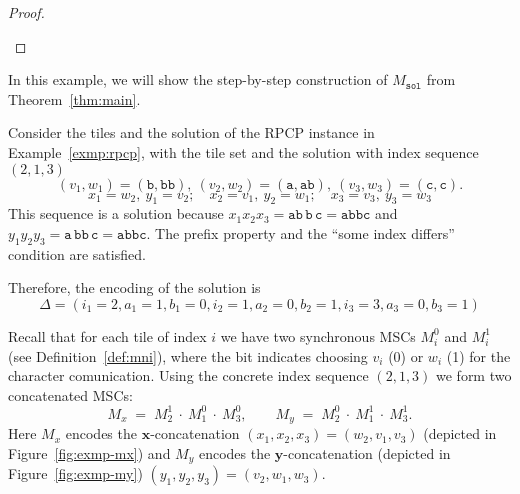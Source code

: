 \begin{proof}
\begin{itemize}
	\end{itemize}

\end{proof}

In this example, we will show the step-by-step construction 
of $M_{\texttt{sol}}$ from Theorem~\ref{thm:main}.

\bigskip

\begin{example}\label{exm:teo}
Consider the tiles and the solution of the RPCP instance 
in Example~\ref{exmp:rpcp}, with the tile set and the solution
with index sequence $(2,1,3)$
$$
 (v_1,w_1)=(\texttt{b},\texttt{bb}),\ 
 (v_2,w_2)=(\texttt{a},\texttt{ab}),\ 
 (v_3,w_3)=(\texttt{c},\texttt{c}).
$$
$$
 x_1=w_2,\ y_1=v_2;\quad x_2=v_1,\ y_2=w_1;\quad x_3=v_3,\ y_3=w_3
$$
This sequence is a solution because
$x_1x_2x_3=\texttt{ab}\,\texttt{b}\,\texttt{c}=\texttt{abbc}$ and
$y_1y_2y_3=\texttt{a}\,\texttt{bb}\,\texttt{c}=\texttt{abbc}$. The
prefix property and the ``some index differs'' condition are satisfied.

Therefore, the encoding of the solution is
$$\Delta = (i_1=2,a_1=1,b_1=0,i_2=1,a_2=0,b_2=1,i_3=3,a_3=0,b_3=1)$$

Recall that for each tile of index \(i\) we have two synchronous MSCs
\(M_i^0\) and \(M_i^1\) (see Definition~\ref{def:mni}), where the bit
indicates choosing \(v_i\) (0) or \(w_i\) (1) for the character comunication.
Using the concrete index sequence \((2,1,3)\) we form two
concatenated MSCs:
\[
  M_x\;=\; M^{1}_{2}\ \cdot\ M^{0}_{1}\ \cdot\ M^{0}_{3},
\qquad
  M_y\;=\; M^{0}_{2}\ \cdot\ M^{1}_{1}\ \cdot\ M^{1}_{3}.
\]
Here \(M_x\) encodes the \(\mathbf{x}\)-concatenation
\((x_1,x_2,x_3)=(w_2,v_1,v_3)\) (depicted 
in Figure~\ref{fig:exmp-mx}) and \(M_y\) encodes 
the \(\mathbf{y}\)-concatenation (depicted in 
Figure~\ref{fig:exmp-my}) \((y_1,y_2,y_3)=(v_2,w_1,w_3)\).

\begin{figure}[!ht]
\centering
\begin{msc}[draw frame=none, draw head=none, msc keyword=, head height=0px, label distance=0.5ex, foot height=0px, foot distance=0px]{}
	\declinst{P2}{P2}{}



\end{msc}
\end{figure}
\end{example}
